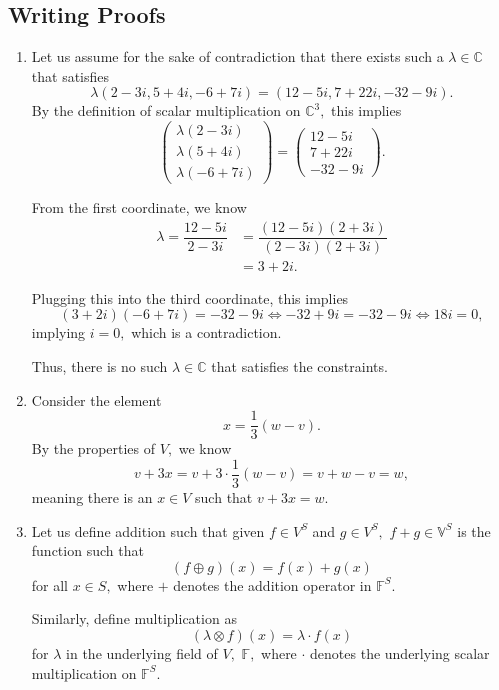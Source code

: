 \documentclass[12pt]{article}
\begin{document}
\subsection{Writing Proofs}
\begin{enumerate}

  \item Let us assume for the sake of contradiction that there exists
    such a $\lambda \in \mathbb C$ that satisfies
    $$
    \lambda(2 - 3i, 5 + 4i, -6+7i) = (12 -5i, 7 + 22i, -32 - 9i).
    $$
    By the definition of scalar multiplication on $\mathbb C^{3},$ this implies
    $$
    \begin{pmatrix}
      \lambda (2 -3 i) \\
      \lambda(5 + 4 i) \\
      \lambda(-6 + 7 i)
    \end{pmatrix} =
    \begin{pmatrix}
      12 - 5i \\
      7 + 22i \\
      -32 - 9i
    \end{pmatrix}.
    $$

    From the first coordinate, we know
    \begin{align*}
      \lambda = \dfrac{12 - 5i}{2 - 3i} &= \dfrac{(12 - 5i)(2+3i)}{(2
      - 3i)(2 + 3i)} \\
      &= 3 + 2i.
    \end{align*}

    Plugging this into the third coordinate, this implies
    $$
    (3+2i)(-6+7i) = -32-9i \Leftrightarrow  -32 +9i = -32-9i
    \Leftrightarrow 18i = 0,
    $$
    implying $i = 0,$ which is a contradiction.

    Thus, there is no such $\lambda \in \mathbb C$ that satisfies the
    constraints.

  \item Consider the element
    $$
    x = \dfrac{1}{3}(w - v).
    $$
    By the properties of $V,$ we know $$
    v + 3x  = v + 3 \cdot \dfrac{1}{3}(w-v) = v + w - v = w,
    $$
    meaning there is an $x \in V$ such that $v + 3x = w.$

  \item Let us define addition such that given $f \in V^{S}$ and $g
    \in V^{S},$ $f + g \in \mathbb V^{S}$ is the function such that
    $$
    (f \oplus g)(x) = f(x) + g(x)
    $$
    for all $x \in S,$ where $+$ denotes the addition operator in
    $\mathbb F^{S}.$

    Similarly, define multiplication as $$(\lambda \otimes f)(x) =
    \lambda \cdot f(x)$$ for $\lambda$ in the underlying field of
    $V,$ $\mathbb F,$ where $\cdot$ denotes the underlying scalar
    multiplication on $\mathbb F^{S}.$


\end{enumerate}
\end{document}
